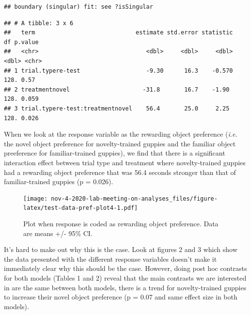 \documentclass[]{book}
\begin{document}
\begin{verbatim}
## boundary (singular) fit: see ?isSingular
\end{verbatim}

\begin{verbatim}
## # A tibble: 3 x 6
##   term                             estimate std.error statistic    df p.value
##   <chr>                               <dbl>     <dbl>     <dbl> <dbl> <chr>  
## 1 trial.typere-test                   -9.30      16.3    -0.570  128. 0.57   
## 2 treatmentnovel                     -31.8       16.7    -1.90   128. 0.059  
## 3 trial.typere-test:treatmentnovel    56.4       25.0     2.25   128. 0.026
\end{verbatim}

When we look at the response variable as the rewarding object preference
(\emph{i.e.} the novel object preference for novelty-trained guppies and
the familiar object preeference for familiar-trained guppies), we find
that there is a significant interaction effect between trial type and
treatment where novelty-trained guppies had a rewarding object
preference that was 56.4 seconds stronger than that of familiar-trained
guppies (p = 0.026).

\begin{figure}
\centering
\texttt{[image: nov-4-2020-lab-meeting-on-analyses\_files/figure-latex/test-data-pref-plot4-1.pdf]}
\caption{\label{fig:test-data-pref-plot4}Plot when response is coded as
rewarding object preference. Data are means +/- 95\% CI.}
\end{figure}

It's hard to make out why this is the case. Look at figures 2 and 3
which show the data presented with the different response variables
doesn't make it immediately clear why this should be the case. However,
doing post hoc contrasts for both models (Tables 1 and 2) reveal that
the main contrasts we are interested in are the same between both
models, there is a trend for novelty-trained guppies to increase their
novel object preference (p = 0.07 and same effect size in both models).
\end{document}
